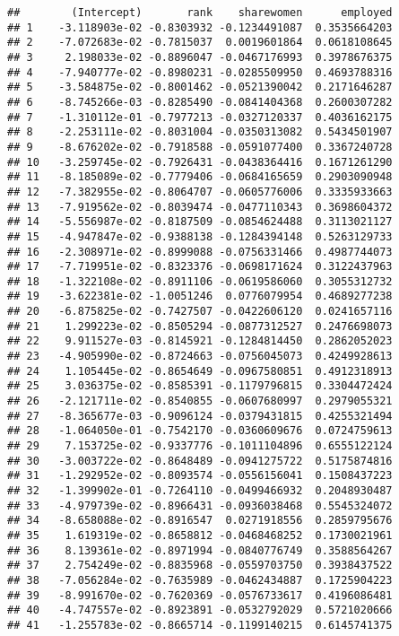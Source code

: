 \documentclass[
]{article}
\begin{document}
\begin{verbatim}
##        (Intercept)       rank    sharewomen      employed
## 1    -3.118903e-02 -0.8303932 -0.1234491087  0.3535664203
## 2    -7.072683e-02 -0.7815037  0.0019601864  0.0618108645
## 3     2.198033e-02 -0.8896047 -0.0467176993  0.3978676375
## 4    -7.940777e-02 -0.8980231 -0.0285509950  0.4693788316
## 5    -3.584875e-02 -0.8001462 -0.0521390042  0.2171646287
## 6    -8.745266e-03 -0.8285490 -0.0841404368  0.2600307282
## 7    -1.310112e-01 -0.7977213 -0.0327120337  0.4036162175
## 8    -2.253111e-02 -0.8031004 -0.0350313082  0.5434501907
## 9    -8.676202e-02 -0.7918588 -0.0591077400  0.3367240728
## 10   -3.259745e-02 -0.7926431 -0.0438364416  0.1671261290
## 11   -8.185089e-02 -0.7779406 -0.0684165659  0.2903090948
## 12   -7.382955e-02 -0.8064707 -0.0605776006  0.3335933663
## 13   -7.919562e-02 -0.8039474 -0.0477110343  0.3698604372
## 14   -5.556987e-02 -0.8187509 -0.0854624488  0.3113021127
## 15   -4.947847e-02 -0.9388138 -0.1284394148  0.5263129733
## 16   -2.308971e-02 -0.8999088 -0.0756331466  0.4987744073
## 17   -7.719951e-02 -0.8323376 -0.0698171624  0.3122437963
## 18   -1.322108e-02 -0.8911106 -0.0619586060  0.3055312732
## 19   -3.622381e-02 -1.0051246  0.0776079954  0.4689277238
## 20   -6.875825e-02 -0.7427507 -0.0422606120  0.0241657116
## 21    1.299223e-02 -0.8505294 -0.0877312527  0.2476698073
## 22    9.911527e-03 -0.8145921 -0.1284814450  0.2862052023
## 23   -4.905990e-02 -0.8724663 -0.0756045073  0.4249928613
## 24    1.105445e-02 -0.8654649 -0.0967580851  0.4912318913
## 25    3.036375e-02 -0.8585391 -0.1179796815  0.3304472424
## 26   -2.121711e-02 -0.8540855 -0.0607680997  0.2979055321
## 27   -8.365677e-03 -0.9096124 -0.0379431815  0.4255321494
## 28   -1.064050e-01 -0.7542170 -0.0360609676  0.0724759613
## 29    7.153725e-02 -0.9337776 -0.1011104896  0.6555122124
## 30   -3.003722e-02 -0.8648489 -0.0941275722  0.5175874816
## 31   -1.292952e-02 -0.8093574 -0.0556156041  0.1508437223
## 32   -1.399902e-01 -0.7264110 -0.0499466932  0.2048930487
## 33   -4.979739e-02 -0.8966431 -0.0936038468  0.5545324072
## 34   -8.658088e-02 -0.8916547  0.0271918556  0.2859795676
## 35    1.619319e-02 -0.8658812 -0.0468468252  0.1730021961
## 36    8.139361e-02 -0.8971994 -0.0840776749  0.3588564267
## 37    2.754249e-02 -0.8835968 -0.0559703750  0.3938437522
## 38   -7.056284e-02 -0.7635989 -0.0462434887  0.1725904223
## 39   -8.991670e-02 -0.7620369 -0.0576733617  0.4196086481
## 40   -4.747557e-02 -0.8923891 -0.0532792029  0.5721020666
## 41   -1.255783e-02 -0.8665714 -0.1199140215  0.6145741375

\end{verbatim}
\end{document}
